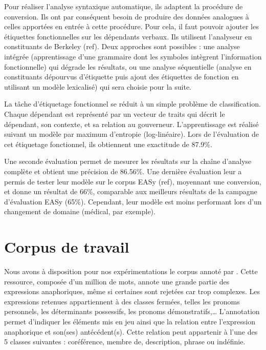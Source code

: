 \documentclass[a4paper,12pt]{article}
\begin{document}
Pour réaliser l'analyse syntaxique automatique, ils adaptent la procédure de conversion. Ils ont par conséquent besoin de produire des données analogues à celles apportées en entrée à cette procédure. Pour cela, il faut pouvoir ajouter les étiquettes fonctionnelles sur les dépendants verbaux. Ils utilisent l'analyseur en constituants de Berkeley (ref). Deux approches sont possibles : une analyse intégrée (apprentissage d'une grammaire dont les symboles intègrent l'information fonctionnelle) qui dégrade les résultats, ou une analyse séquentielle (analyse en constituants dépourvus d'étiquette puis ajout des étiquettes de fonction en utilisant un modèle lexicalisé) qui sera choisie pour la suite.

La tâche d'étiquetage fonctionnel se réduit à un simple problème de classification. Chaque dépendant est représenté par un vecteur de traits qui décrit le dépendant, son contexte, et sa relation au gouverneur. L'apprentissage est réalisé suivant un modèle par maximum d'entropie (log-linéaire). Lors de l'évaluation de cet étiquetage fonctionnel, ils obtiennent une exactitude de 87.9\%.

Une seconde évaluation permet de mesurer les résultats sur la chaîne d'analyse complète et obtient une précision de 86.56\%. Une dernière évaluation leur a permis de tester leur modèle sur le corpus EASy (ref), moyennant une conversion, et donne un résultat de 66\%, comparable aux meilleurs résultats de la campagne d'évaluation EASy (65\%). Cependant, leur modèle est moins performant lors d'un changement de domaine (médical, par exemple).

\section{Corpus de travail}
\label{corpus}

Nous avons à disposition pour nos expérimentations le corpus annoté par \citet{tutin-hal-00373327}.
Cette ressource, composée d'un million de mots, annote une grande partie des expressions anaphoriques, même si certaines sont rejetées car trop complexes. Les expressions retenues appartiennent à des classes fermées, telles les pronoms personnels, les déterminants possessifs, les pronoms démonstratifs,\ldots
L'annotation permet d'indiquer les éléments mis en jeu ainsi que la relation entre l'expression anaphorique et son(ses) antécédent(s). Cette relation peut appartenir à l'une des 5 classes suivantes : coréférence, membre de, description, phrase ou indéfinie.
\end{document}
